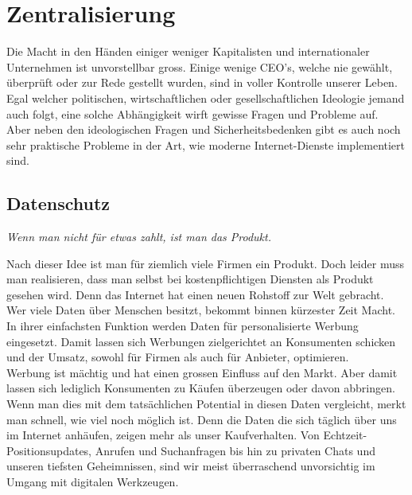 \documentclass[a4paper,11pt,titlepage,twoside]{memoir}
\begin{document}
\section{Zentralisierung}
\label{sec:orgde305b2}
\noindent Die Macht in den Händen einiger weniger Kapitalisten und
internationaler Unternehmen ist unvorstellbar gross. Einige wenige
CEO's, welche nie gewählt, überprüft oder zur Rede gestellt wurden,
sind in voller Kontrolle unserer Leben. Egal welcher politischen,
wirtschaftlichen oder gesellschaftlichen Ideologie jemand auch folgt,
eine solche Abhängigkeit wirft gewisse Fragen und Probleme auf.\\

\noindent Aber neben den ideologischen Fragen und Sicherheitsbedenken
gibt es auch noch sehr praktische Probleme in der Art, wie moderne
Internet-Dienste implementiert sind.
\subsection{Datenschutz}
\label{sec:orgf260585}
\begin{center}
\emph{Wenn man nicht für etwas zahlt, ist man das Produkt.}
\end{center}
Nach dieser Idee ist man für ziemlich viele Firmen ein Produkt. Doch
leider muss man realisieren, dass man selbst bei kostenpflichtigen
Diensten als Produkt gesehen wird. Denn das Internet hat einen neuen
Rohstoff zur Welt gebracht. Wer viele Daten über Menschen besitzt,
bekommt binnen kürzester Zeit Macht.\\

\noindent In ihrer einfachsten Funktion werden Daten für
personalisierte Werbung eingesetzt. Damit lassen sich Werbungen
zielgerichtet an Konsumenten schicken und der Umsatz, sowohl für
Firmen als auch für Anbieter, optimieren.\\

\noindent Werbung ist mächtig und hat einen grossen Einfluss auf den
Markt. Aber damit lassen sich lediglich Konsumenten zu Käufen
überzeugen oder davon abbringen. Wenn man dies mit dem tatsächlichen
Potential in diesen Daten vergleicht, merkt man schnell, wie viel noch
möglich ist. Denn die Daten die sich täglich über uns im Internet
anhäufen, zeigen mehr als unser Kaufverhalten. Von
Echtzeit-Positionsupdates, Anrufen und Suchanfragen bis hin zu privaten
Chats und unseren tiefsten Geheimnissen, sind wir meist überraschend
unvorsichtig im Umgang mit digitalen Werkzeugen.\\
\end{document}

